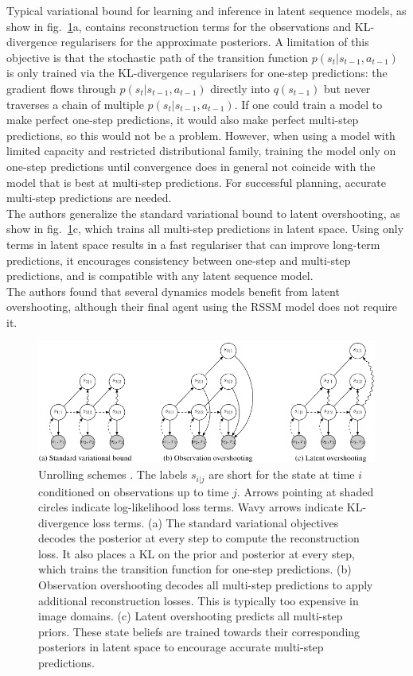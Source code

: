 Typical variational bound for learning and inference in latent sequence models, as show in fig.~\ref{Fig.PlaNetModelUnrolling}a, contains reconstruction terms for the observations and KL-divergence regularisers for the approximate posteriors. A limitation of this objective is that the stochastic path of the transition function $p(s_t | s_{t-1}, a_{t-1})$ is only trained via the KL-divergence regularisers for one-step predictions: the gradient flows through $p(s_t | s_{t-1}, a_{t-1})$ directly into $q(s_{t−1})$ but never traverses a chain of multiple $p(s_t | s_{t-1}, a_{t-1})$. If one could train a model to make perfect one-step predictions, it would also make perfect multi-step predictions, so this would not be a problem. However, when using a model with limited capacity and restricted distributional family, training the model only on one-step predictions until convergence does in general not coincide with the model that is best at multi-step predictions. For successful planning, accurate multi-step predictions are needed. \\
The authors generalize the standard variational bound to latent overshooting, as show in fig.~\ref{Fig.PlaNetModelUnrolling}c, which trains all multi-step predictions in latent space. Using only terms in latent space results in a fast regulariser that can improve long-term predictions, it encourages consistency between one-step and multi-step predictions, and is compatible with any latent sequence model. \\
The authors found that several dynamics models benefit from latent overshooting, although their final agent using the RSSM model does not require it.

\begin{figure}[H]
\includegraphics[width=1.0\textwidth,keepaspectratio]{figures/PlaNet/overshooting.png}
\caption[PlaNet latent dynamics model unrolling schemes]{Unrolling schemes \protect\cite{Algo.PlaNet}. The labels $s_{i|j}$ are short for the state at time $i$ conditioned on observations up to time $j$. Arrows pointing at shaded circles indicate log-likelihood loss terms. Wavy arrows indicate KL-divergence loss terms. (a) The standard variational objectives decodes the posterior at every step to compute the reconstruction loss. It also places a KL on the prior and posterior at every step, which trains the transition function for one-step predictions. (b) Observation overshooting decodes all multi-step predictions to apply additional reconstruction losses. This is typically too expensive in image domains. (c) Latent overshooting predicts all multi-step priors. These state beliefs are trained towards their corresponding posteriors in latent space to encourage accurate multi-step predictions.}
\label{Fig.PlaNetModelUnrolling}
\end{figure}

